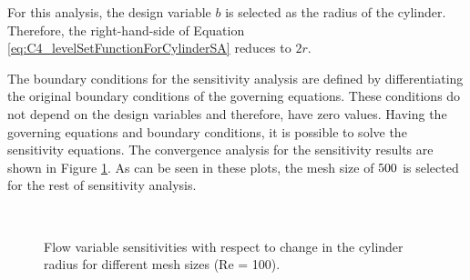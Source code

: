 For this analysis, the design variable $b$ is selected as the radius of the cylinder. Therefore, the right-hand-side of Equation \eqref{eq:C4_levelSetFunctionForCylinderSA} reduces to $2r$.

The boundary conditions for the sensitivity analysis are defined by differentiating the original boundary conditions of the governing equations. These conditions do not depend on the design variables and therefore, have zero values. Having the governing equations and boundary conditions, it is possible to solve the sensitivity equations. The convergence analysis for the sensitivity results are shown in Figure \ref{fig:C4_flowOverCylinderSAmeshConvergence}. As can be seen in these plots, the mesh size of $500 \time 375$ is selected for the rest of sensitivity analysis.

\begin{figure}[H]
    \centering
    \quad
    \\
    \caption{Flow variable sensitivities with respect to change in the cylinder radius for different mesh sizes (Re = 100).}
    \label{fig:C4_flowOverCylinderSAmeshConvergence}
\end{figure}

